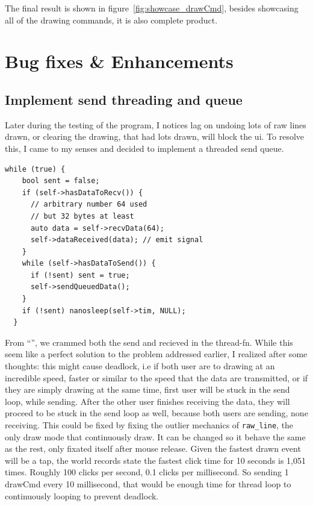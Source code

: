 \documentclass[11pt]{article}
\begin{document}
\begin{multicols*}{2}
The final result is shown in figure~\ref{fig:showcase_drawCmd}, besides showcasing all of the drawing commands, it is also complete product.

\section{Bug fixes \& Enhancements}

\subsection{Implement send threading and queue}

Later during the testing of the program, I notices lag on undoing lots of raw lines drawn, or clearing the drawing, that had lots drawn, will block the ui. To resolve this, I came to my senses and decided to implement a threaded send queue.

\begin{lstlisting}[label={lst:new-thread-worker-fn}, caption={new thread worker fn}]
  while (true) {
    bool sent = false;
    if (self->hasDataToRecv()) {
      // arbitrary number 64 used
      // but 32 bytes at least
      auto data = self->recvData(64);
      self->dataReceived(data); // emit signal
    }
    while (self->hasDataToSend()) {
      if (!sent) sent = true;
      self->sendQueuedData();
    }
    if (!sent) nanosleep(self->tim, NULL);
  }
\end{lstlisting}

From ``'', we crammed both the send and recieved in the thread-fn. While this seem like a perfect solution to the problem addressed earlier, I realized after some thoughts: this might cause deadlock, i.e if both user are to drawing at an incredible speed, faster or similar to the speed that the data are transmitted, or if they are simply drawing at the same time, first user will be stuck in the send loop, while sending. After the other user finishes receiving the data, they will proceed to be stuck in the send loop as well, because both users are sending, none receiving.
This could be fixed by fixing the outlier mechanics of \verb|raw_line|, the only draw mode that continuously draw. It can be changed so it behave the same as the rest, only fixated itself after mouse release. Given the fastest drawn event will be a tap, the world records state the fastest click time for 10 seconds is 1,051 times. Roughly 100 clicks per second, 0.1 clicks per millisecond. So sending 1 drawCmd every 10 millisecond, that would be enough time for thread loop to continuously looping to prevent deadlock.


\end{multicols*}
\end{document}
